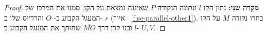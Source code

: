 \begin{proof}
%
%
%
%

\medskip

\textbf{מקרה שני:}
נתון הקו
$l$
ונתונה הנקודה
$P$
שאיננה נמצאת על הקו. סמנו את המרכז של המעגל הקבוע ב-%
$O$
והרדיוס שלו ב-%
$r$
(איור%
~\ref{f.se-parallel-other1}).
בחרו נקודה
$M$
על הקו 
$l$
ובנו קרן דרך 
$\overline{MO}$
שחותך את המעגל הקבוע ב-%
$U,V$.


\end{proof}
